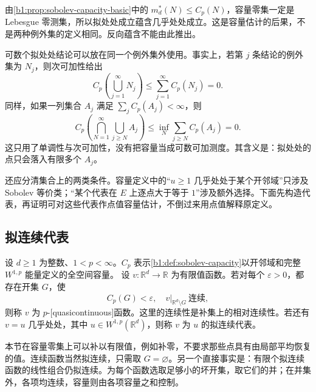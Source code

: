 由\cref{b1:prop:sobolev-capacity-basic}中的 \(m_d^*(N)\leq C_p(N)\)，容量零集一定是 Lebesgue 零测集，所以拟处处成立蕴含几乎处处成立。这是容量估计的后果，不是两种例外集的定义相同。反向蕴含不能由此推出。

\ProseParagraphBreak

可数个拟处处结论可以放在同一个例外集外使用。事实上，若第 \(j\) 条结论的例外集为 \(N_j\)，则次可加性给出
\[
 C_p\left(\bigcup_{j=1}^{\infty}N_j\right)
 \leq\sum_{j=1}^{\infty}C_p(N_j)=0.
\]
同样，如果一列集合 \(A_j\) 满足 \(\sum_j C_p(A_j)<\infty\)，则
\begin{equation}\label{b1:eq:capacity-summable-exceptions}
 C_p\left(\bigcap_{N=1}^{\infty}\bigcup_{j\geq N}A_j\right)
 \leq\inf_N\sum_{j\geq N}C_p(A_j)=0.
\end{equation}
这只用了单调性与次可加性，没有把容量当成可数可加测度。其含义是：拟处处的点只会落入有限多个 \(A_j\)。

\ProseParagraphBreak

还应分清集合上的两类条件。容量定义中的“\(u\geq1\) 几乎处处于某个开邻域”只涉及 Sobolev 等价类；“某个代表在 \(E\) 上逐点大于等于 \(1\)”涉及额外选择。下面先构造代表，再证明可对这些代表作点值容量估计，不倒过来用点值解释原定义。

\subsection{拟连续代表}
\label{b1:subsec:260202}

\begin{definition}\label{b1:def:sobolev-quasicontinuous}
设 \(d\geq1\) 为整数、\(1<p<\infty\)。\(C_p\) 表示\cref{b1:def:sobolev-capacity}以开邻域和完整 \(W^{1,p}\) 能量定义的全空间容量。
设 \(v\colon\mathbb R^d\rightarrow\mathbb R\) 为有限值函数。若对每个 \(\varepsilon>0\)，都存在开集 \(G\)，使
\[
 C_p(G)<\varepsilon,\quad
 v|_{\mathbb R^d\setminus G}\ \text{连续},
\]
则称 \(v\) 为 \(p\)-[quasicontinuous]函数。这里的连续性是补集上的相对连续性。若还有 \(v=u\) 几乎处处，其中 \(u\in W^{1,p}(\mathbb R^d)\)，则称 \(v\) 为 \(u\) 的拟连续代表。
\end{definition}

本节在容量零集上可以补以有限值，例如补零，不要求那些点具有由局部平均恢复的值。连续函数当然拟连续，只需取 \(G=\varnothing\)。另一个直接事实是：有限个拟连续函数的线性组合仍拟连续。为每个函数选取足够小的坏开集，取它们的并；在并集外，各项均连续，容量则由各项容量之和控制。

